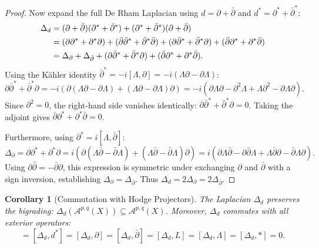 \documentclass[11pt,a4paper]{article}
\theoremstyle{definition}
\theoremstyle{plain}
\newtheorem{corollary}[definition]{Corollary}
\begin{document}
\begin{proof}
Now expand the full De Rham Laplacian using $d = \partial + \bar{\partial}$ and $d^* = \partial^* + \bar{\partial}^*$:
\begin{align}
    \Delta_d &= (\partial + \bar{\partial})(\partial^* + \bar{\partial}^*) + (\partial^* + \bar{\partial}^*)(\partial + \bar{\partial}) \notag \\
    &= (\partial \partial^* + \partial^* \partial) + (\bar{\partial} \bar{\partial}^* + \bar{\partial}^* \bar{\partial}) + (\partial \bar{\partial}^* + \bar{\partial}^* \partial) + (\bar{\partial} \partial^* + \partial^* \bar{\partial}) \notag \\
    &= \Delta_{\partial} + \Delta_{\bar{\partial}} + (\partial \bar{\partial}^* + \bar{\partial}^* \partial) + (\bar{\partial} \partial^* + \partial^* \bar{\partial}).
\end{align}
Using the Kähler identity $\bar{\partial}^* = -i [\Lambda, \partial] = -i (\Lambda \partial - \partial \Lambda)$:
\begin{equation}
    \partial \bar{\partial}^* + \bar{\partial}^* \partial = -i \left( \partial(\Lambda \partial - \partial \Lambda) + (\Lambda \partial - \partial \Lambda)\partial \right) = -i \left( \partial \Lambda \partial - \partial^2 \Lambda + \Lambda \partial^2 - \partial \Lambda \partial \right).
\end{equation}
Since $\partial^2 = 0$, the right-hand side vanishes identically: $\partial \bar{\partial}^* + \bar{\partial}^* \partial = 0$. Taking the adjoint gives $\bar{\partial} \partial^* + \partial^* \bar{\partial} = 0$.

Furthermore, using $\partial^* = i [\Lambda, \bar{\partial}]$:
\begin{equation}
    \Delta_{\partial} = \partial \partial^* + \partial^* \partial = i \left( \partial(\Lambda \bar{\partial} - \bar{\partial} \Lambda) + (\Lambda \bar{\partial} - \bar{\partial} \Lambda)\partial \right) = i \left( \partial \Lambda \bar{\partial} - \partial \bar{\partial} \Lambda + \Lambda \bar{\partial} \partial - \bar{\partial} \Lambda \partial \right).
\end{equation}
Using $\partial \bar{\partial} = -\bar{\partial} \partial$, this expression is symmetric under exchanging $\partial$ and $\bar{\partial}$ with a sign inversion, establishing $\Delta_{\partial} = \Delta_{\bar{\partial}}$. Thus $\Delta_d = 2 \Delta_{\partial} = 2 \Delta_{\bar{\partial}}$.
\end{proof}

\begin{corollary}[Commutation with Hodge Projectors]
The Laplacian $\Delta_d$ preserves the bigrading: $\Delta_d(\mathcal{A}^{p,q}(X)) \subseteq \mathcal{A}^{p,q}(X)$. Moreover, $\Delta_d$ commutes with all exterior operators:
\begin{equation}
    [\Delta_d, d] = [\Delta_d, d^*] = [\Delta_d, \partial] = [\Delta_d, \bar{\partial}] = [\Delta_d, L] = [\Delta_d, \Lambda] = [\Delta_d, *] = 0.
\end{equation}
\end{corollary}
\end{document}
